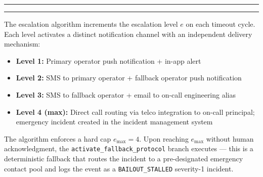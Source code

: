 \bigskip
\noindent\rule{\textwidth}{0.5pt}
\rule{}{0.5pt}

\bigskip
The escalation algorithm increments the escalation level $e$ on each timeout cycle. Each level activates a distinct notification channel with an independent delivery mechanism:

\begin{itemize}
  \item \textbf{Level 1:} Primary operator push notification + in-app alert
  \item \textbf{Level 2:} SMS to primary operator + fallback operator push notification
  \item \textbf{Level 3:} SMS to fallback operator + email to on-call engineering alias
  \item \textbf{Level 4 (max):} Direct call routing via telco integration to on-call principal; emergency incident created in the incident management system
\end{itemize}

The algorithm enforces a hard cap $e_{\text{max}} = 4$. Upon reaching $e_{\text{max}}$ without human acknowledgment, the \texttt{activate\_fallback\_protocol} branch executes — this is a deterministic fallback that routes the incident to a pre-designated emergency contact pool and logs the event as a \texttt{BAILOUT\_STALLED} severity-1 incident.

